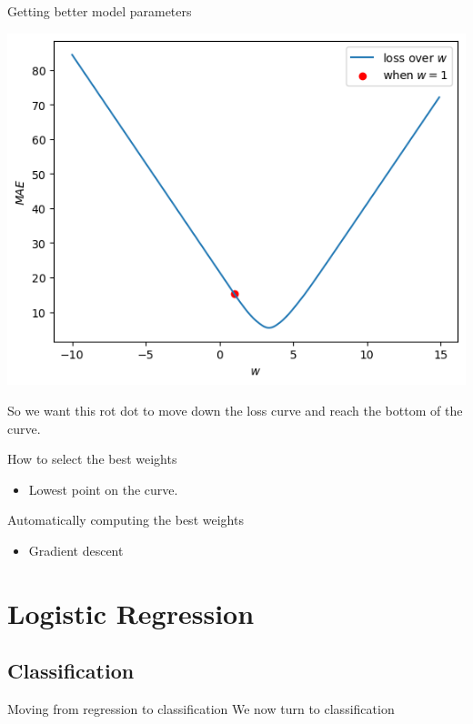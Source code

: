 \documentclass[10pt]{beamer}
\begin{document}
\begin{frame}[fragile,allowframebreaks,label=]{Getting better model parameters}
\begin{center}
\includegraphics[width=.9\linewidth]{images/loss_curve_w_1.png}
\end{center}

So we want this rot dot to move down the loss curve and reach the bottom of the curve.
\end{frame}

\begin{frame}[label={sec:org552dc85}]{How to select the best weights}
\begin{itemize}
\item Lowest point on the curve.
\end{itemize}
\end{frame}

\begin{frame}[label={sec:org5af8d90}]{Automatically computing the best weights}
\begin{itemize}
\item Gradient descent
\end{itemize}
\end{frame}

\section*{Logistic Regression}
\label{sec:org9bca7ba}

\subsection*{Classification}
\label{sec:orga17b7d0}

\begin{frame}[label={sec:orgd5e46f3}]{Moving from regression to classification}
We now turn to classification
\end{frame}
\end{document}
